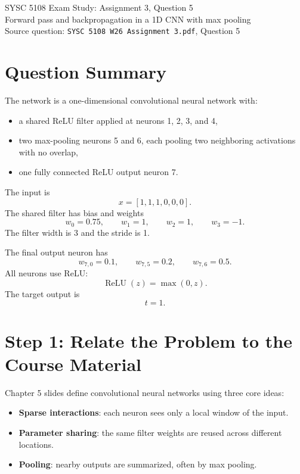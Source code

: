 \documentclass[11pt]{article}
\begin{document}
\begin{center}
{\Large SYSC 5108 Exam Study: Assignment 3, Question 5}\\
\vspace{0.3em}
{\large Forward pass and backpropagation in a 1D CNN with max pooling}\\
\vspace{0.3em}
Source question: \texttt{SYSC 5108 W26 Assignment 3.pdf}, Question 5
\end{center}

\section*{Question Summary}

The network is a one-dimensional convolutional neural network with:
\begin{itemize}
\item a shared ReLU filter applied at neurons 1, 2, 3, and 4,
\item two max-pooling neurons 5 and 6, each pooling two neighboring activations with no overlap,
\item one fully connected ReLU output neuron 7.
\end{itemize}

The input is
\[
x=[1,1,1,0,0,0].
\]
The shared filter has bias and weights
\[
w_0=0.75,\qquad w_1=1,\qquad w_2=1,\qquad w_3=-1.
\]
The filter width is 3 and the stride is 1.

The final output neuron has
\[
w_{7,0}=0.1,\qquad w_{7,5}=0.2,\qquad w_{7,6}=0.5.
\]
All neurons use ReLU:
\[
\operatorname{ReLU}(z)=\max(0,z).
\]
The target output is
\[
t=1.
\]

\section*{Step 1: Relate the Problem to the Course Material}

Chapter 5 slides define convolutional neural networks using three core ideas:
\begin{itemize}
\item \textbf{Sparse interactions}: each neuron sees only a local window of the input.
\item \textbf{Parameter sharing}: the same filter weights are reused across different locations.
\item \textbf{Pooling}: nearby outputs are summarized, often by max pooling.
\end{itemize}
\end{document}
